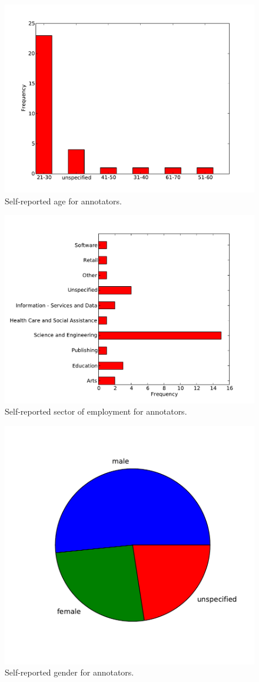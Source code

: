 \begin{figure}[tb]
\centering
\includegraphics[width = 0.60 \columnwidth]{corpus/demographicAge.pdf}
\caption{Self-reported age for annotators.}
\label{FigureDemographicAge}
\end{figure}

\begin{figure}[tb]
\centering
\includegraphics[width = 0.60 \columnwidth]{corpus/demographicWork.pdf}
\caption{Self-reported sector of employment for annotators.}
\label{FigureDemographicWork}
\end{figure}

\begin{figure}[tb]
\centering
\includegraphics[width = 0.5 \columnwidth]{corpus/demographicGender.pdf}
\caption{Self-reported gender for annotators.}
\label{FigureDemographicGender}
\end{figure}

